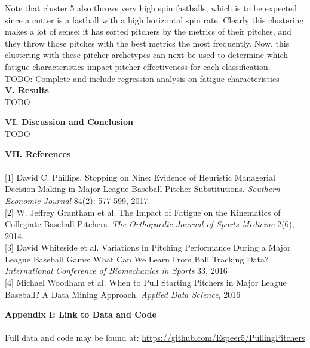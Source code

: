 \documentclass[12 pt]{article}
\begin{document}
Note that cluster 5 also throws very high spin fastballs, which 
is to be expected since a cutter is a fastball with a high horizontal spin rate. Clearly this 
clustering makes a lot of sense; it has sorted pitchers by the metrics of their pitches, and 
they throw those pitches with the best metrics the most frequently. Now, this clustering with 
these pitcher archetypes can next be used to determine which fatigue characteristics impact 
pitcher effectiveness for each classification. \\

TODO: Complete and include regression analysis on fatigue characteristics \\

\textbf{V. Results} \\
TODO

\textbf{VI. Discussion and Conclusion} \\
TODO

\pagebreak
\textbf{VII. References} \\
\\
\hypertarget{1}{[1]} David C. Phillips. Stopping on Nine: Evidence of Heuristic 
Managerial Decision-Making in Major League Baseball Pitcher Substitutions.
\emph{Southern Economic Journal} 84(2): 577-599, 2017.
\\
\hypertarget{2}{[2]} W. Jeffrey Grantham et al. The Impact of Fatigue on the Kinematics 
of Collegiate Baseball Pitchers. \emph{The Orthopaedic Journal of Sports Medicine}
2(6), 2014.
\\
\hypertarget{3}{[3]} David Whiteside et al. Variations in Pitching Performance During a 
Major League Baseball Game: What Can We Learn From Ball Tracking Data? 
\emph{International Conference of Biomechanics in Sports} 33, 2016
\\
\hypertarget{4}{[4]} Michael Woodham et al. When to Pull Starting Pitchers in Major League Baseball? A Data Mining Approach.
\emph{Applied Data Science}, 2016


\pagebreak
\textbf{Appendix I: Link to Data and Code} \\
\\
Full data and code may be found at: \url{https://github.com/Espeer5/PullingPitchers}
\end{document}
